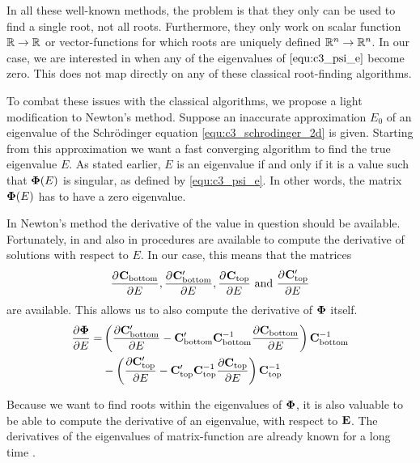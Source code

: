In all these well-known methods, the problem is that they only can be used to find a single root, not all roots. Furthermore, they only work on scalar function $\mathbb{R} \to \mathbb{R}$ or vector-functions for which roots are uniquely defined $\mathbb{R}^n \to \mathbb{R}^n$. In our case, we are interested in when any of the eigenvalues of $\eqref{equ:c3_psi_e}$ become zero. This does not map directly on any of these classical root-finding algorithms.

To combat these issues with the classical algorithms, we propose a light modification to Newton's method. Suppose an inaccurate approximation $E_0$ of an eigenvalue of the Schrödinger equation \eqref{equ:c3_schrodinger_2d} is given. Starting from this approximation we want a fast converging algorithm to find the true eigenvalue $E$. As stated earlier, $E$ is an eigenvalue if and only if it is a value such that $\vb{\Phi}(E)$ is singular, as defined by \eqref{equ:c3_psi_e}. In other words, the matrix $\vb{\Phi}(E)$ has to have a zero eigenvalue.

In Newton's method the derivative of the value in question should be available. Fortunately, in \cite{ixaru_lilix_2002} and also in \cite{ledoux_cpmp_2006} procedures are available to compute the derivative of solutions with respect to $E$. In our case, this means that the matrices
$$
    \pdv[]{\vb{C}_\text{bottom}}{E}, \pdv[]{\vb{C}_\text{bottom}'}{E}, \pdv[]{\vb{C}_\text{top}}{E} \text{ and } \pdv[]{\vb{C}_\text{top}'}{E}
$$
are available. This allows us to also compute the derivative of $\vb{\Phi}$ itself.
\begin{align*}
    \pdv{\vb{\Phi}}{E} = & \left(\pdv{\vb{C}_\text{bottom}'}{E} - \vb{C}_\text{bottom}'\vb{C}_\text{bottom}^{-1}\pdv{\vb{C}_\text{bottom}}{E}\right) \vb{C}_\text{bottom}^{-1} \\
                         & - \left(\pdv{\vb{C}_\text{top}'}{E} - \vb{C}_\text{top}'\vb{C}_\text{top}^{-1}\pdv{\vb{C}_\text{top}}{E}\right) \vb{C}_\text{top}^{-1}
\end{align*}

Because we want to find roots within the eigenvalues of $\vb{\Phi}$, it is also valuable to be able to compute the derivative of an eigenvalue, with respect to $\vb{E}$. The derivatives of the eigenvalues of matrix-function are already known for a long time \cite{lancaster_eigenvalues_1964}.

